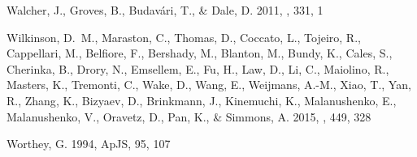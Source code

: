 \begin{thebibliography}
{Walcher}, J., {Groves}, B., {Budav{\'a}ri}, T., \& {Dale}, D. 2011, \apss,
  331, 1


{Wilkinson}, D.~M., {Maraston}, C., {Thomas}, D., {Coccato}, L., {Tojeiro}, R.,
  {Cappellari}, M., {Belfiore}, F., {Bershady}, M., {Blanton}, M., {Bundy}, K.,
  {Cales}, S., {Cherinka}, B., {Drory}, N., {Emsellem}, E., {Fu}, H., {Law},
  D., {Li}, C., {Maiolino}, R., {Masters}, K., {Tremonti}, C., {Wake}, D.,
  {Wang}, E., {Weijmans}, A.-M., {Xiao}, T., {Yan}, R., {Zhang}, K., {Bizyaev},
  D., {Brinkmann}, J., {Kinemuchi}, K., {Malanushenko}, E., {Malanushenko}, V.,
  {Oravetz}, D., {Pan}, K., \& {Simmons}, A. 2015, \mnras, 449, 328


Worthey, G. 1994, ApJS, 95, 107
 \href{http://adsabs.harvard.edu/cgi-bin/nph-data_query?bibcode=1994ApJS...95.%
.107W&link_type=ABSTRACT}{\urllinklabel}

\end{thebibliography}